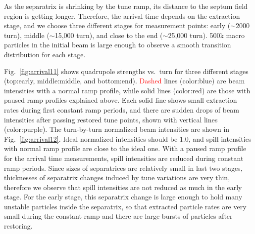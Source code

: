 \documentclass[aps,prstab,onecolumn,preprint,endfloats,11pt]{revtex4-1}
\begin{document}
As the separatrix is shrinking by the tune ramp, its distance to the septum field region is getting longer. Therefore, the arrival time depends on the extraction stage, and we choose three different stages for measurement points: early ($\sim$2000 turn), middle ($\sim$15,000 turn), and close to the end ($\sim$25,000 turn). 500k macro particles in the initial beam is large enough to observe a smooth transition distribution for each stage.

Fig.~\ref{fig:arrival11} shows quadrupole strengths vs.~turn for three different stages (top:early, middle:middle, and bottom:end). \textcolor{red}{Dashed} lines (color:blue) are beam intensities with a normal ramp profile, while solid lines (color:red) are those with paused ramp profiles explained above. Each solid line shows small extraction rates during first constant ramp periods, and there are sudden drops of beam intensities after passing restored tune points, shown with vertical lines (color:purple). The turn-by-turn normalized beam intensities are shown in Fig.~\ref{fig:arrival12}. Ideal normalized intensities should be 1.0, and spill intensities with normal ramp profile are close to the ideal one. With a paused ramp profile for the arrival time measurements, spill intensities are reduced during constant ramp periods. Since sizes of separatrices are relatively small in last two stages, thicknesses of separatrix changes induced by tune variations are very thin, therefore we observe that spill intensities are not reduced as much in the early stage. For the early stage, this separatrix change is large enough to hold many unstable particles inside the separatrix, so that extracted particle rates are very small during the constant ramp and there are large bursts of particles after restoring. 
\end{document}
